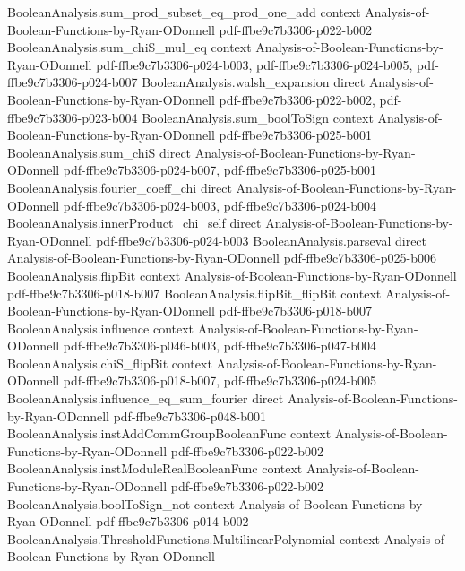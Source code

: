 \begin{lemma}
  {BooleanAnalysis.sum_prod_subset_eq_prod_one_add}
  {context}
  {Analysis-of-Boolean-Functions-by-Ryan-ODonnell}
  {pdf-ffbe9c7b3306-p022-b002}
\proofstep
  {BooleanAnalysis.sum_chiS_mul_eq}
  {context}
  {Analysis-of-Boolean-Functions-by-Ryan-ODonnell}
  {pdf-ffbe9c7b3306-p024-b003,
    pdf-ffbe9c7b3306-p024-b005,
    pdf-ffbe9c7b3306-p024-b007}
\proofstep
  {BooleanAnalysis.walsh_expansion}
  {direct}
  {Analysis-of-Boolean-Functions-by-Ryan-ODonnell}
  {pdf-ffbe9c7b3306-p022-b002,
    pdf-ffbe9c7b3306-p023-b004}
\proofstep
  {BooleanAnalysis.sum_boolToSign}
  {context}
  {Analysis-of-Boolean-Functions-by-Ryan-ODonnell}
  {pdf-ffbe9c7b3306-p025-b001}
\proofstep
  {BooleanAnalysis.sum_chiS}
  {direct}
  {Analysis-of-Boolean-Functions-by-Ryan-ODonnell}
  {pdf-ffbe9c7b3306-p024-b007,
    pdf-ffbe9c7b3306-p025-b001}
\proofstep
  {BooleanAnalysis.fourier_coeff_chi}
  {direct}
  {Analysis-of-Boolean-Functions-by-Ryan-ODonnell}
  {pdf-ffbe9c7b3306-p024-b003,
    pdf-ffbe9c7b3306-p024-b004}
\proofstep
  {BooleanAnalysis.innerProduct_chi_self}
  {direct}
  {Analysis-of-Boolean-Functions-by-Ryan-ODonnell}
  {pdf-ffbe9c7b3306-p024-b003}
\proofstep
  {BooleanAnalysis.parseval}
  {direct}
  {Analysis-of-Boolean-Functions-by-Ryan-ODonnell}
  {pdf-ffbe9c7b3306-p025-b006}
\proofstep
  {BooleanAnalysis.flipBit}
  {context}
  {Analysis-of-Boolean-Functions-by-Ryan-ODonnell}
  {pdf-ffbe9c7b3306-p018-b007}
\proofstep
  {BooleanAnalysis.flipBit_flipBit}
  {context}
  {Analysis-of-Boolean-Functions-by-Ryan-ODonnell}
  {pdf-ffbe9c7b3306-p018-b007}
\proofstep
  {BooleanAnalysis.influence}
  {context}
  {Analysis-of-Boolean-Functions-by-Ryan-ODonnell}
  {pdf-ffbe9c7b3306-p046-b003,
    pdf-ffbe9c7b3306-p047-b004}
\proofstep
  {BooleanAnalysis.chiS_flipBit}
  {context}
  {Analysis-of-Boolean-Functions-by-Ryan-ODonnell}
  {pdf-ffbe9c7b3306-p018-b007,
    pdf-ffbe9c7b3306-p024-b005}
\proofstep
  {BooleanAnalysis.influence_eq_sum_fourier}
  {direct}
  {Analysis-of-Boolean-Functions-by-Ryan-ODonnell}
  {pdf-ffbe9c7b3306-p048-b001}
\proofstep
  {BooleanAnalysis.instAddCommGroupBooleanFunc}
  {context}
  {Analysis-of-Boolean-Functions-by-Ryan-ODonnell}
  {pdf-ffbe9c7b3306-p022-b002}
\proofstep
  {BooleanAnalysis.instModuleRealBooleanFunc}
  {context}
  {Analysis-of-Boolean-Functions-by-Ryan-ODonnell}
  {pdf-ffbe9c7b3306-p022-b002}
\proofstep
  {BooleanAnalysis.boolToSign_not}
  {context}
  {Analysis-of-Boolean-Functions-by-Ryan-ODonnell}
  {pdf-ffbe9c7b3306-p014-b002}
\proofstep
  {BooleanAnalysis.ThresholdFunctions.MultilinearPolynomial}
  {context}
  {Analysis-of-Boolean-Functions-by-Ryan-ODonnell}

\end{lemma}
